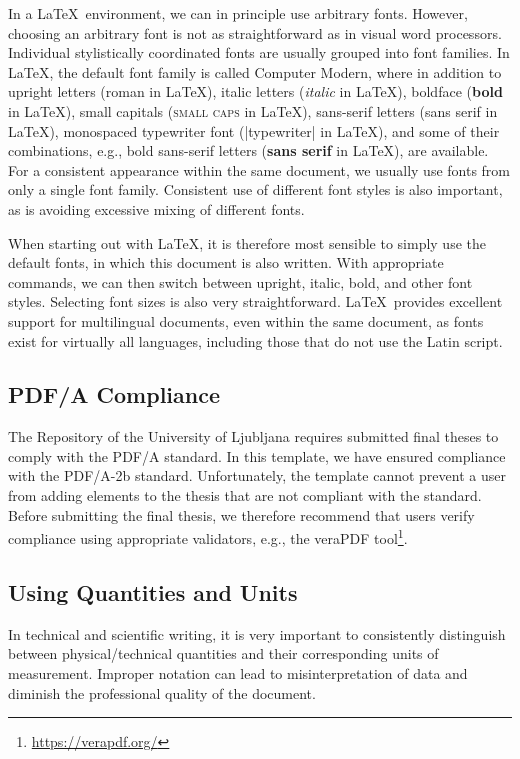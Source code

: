 \documentclass[9pt]{style/friteza}
\begin{document}
In a \LaTeX\ environment, we can in principle use arbitrary fonts.
However, choosing an arbitrary font is not as straightforward as in visual word processors.
Individual stylistically coordinated fonts are usually grouped into font families.
In \LaTeX, the default font family is called Computer Modern,
where in addition to upright letters (roman in \LaTeX), italic letters (\textit{italic} in \LaTeX),
boldface (\textbf{bold} in \LaTeX), small capitals (\textsc{small caps} in \LaTeX), sans-serif letters ({\textsf{sans serif} in \LaTeX}), monospaced typewriter font (\ltx|typewriter| in \LaTeX), and some of their combinations, e.g., bold sans-serif letters
({\textbf{\textsf{sans serif}} in \LaTeX}), are available.
For a consistent appearance within the same document, we usually use fonts from only a single font family.
Consistent use of different font styles is also important, as is avoiding excessive mixing of different fonts.

When starting out with \LaTeX, it is therefore most sensible to simply use the default fonts, in which this document is also written.
With appropriate commands, we can then switch between upright, italic, bold, and other font styles.
Selecting font sizes is also very straightforward.
\LaTeX\ provides excellent support for multilingual documents, even within the same document, as fonts exist for virtually all languages, including those that do not use the Latin script.

\subsection{PDF/A Compliance}

The Repository of the University of Ljubljana requires submitted final theses to comply with the PDF/A standard. In this template, we have ensured compliance with the PDF/A-2b standard. Unfortunately, the template cannot prevent a user from adding elements to the thesis that are not compliant with the standard. Before submitting the final thesis, we therefore recommend that users verify compliance using appropriate validators, e.g., the veraPDF tool\footnote{\url{https://verapdf.org/}}.

\subsection{Using Quantities and Units}

In technical and scientific writing, it is very important to consistently distinguish between physical/technical quantities and their corresponding units of measurement. Improper notation can lead to misinterpretation of data and diminish the professional quality of the document.
\end{document}
